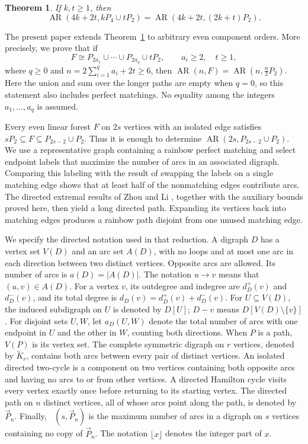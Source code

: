 \documentclass[10pt,a4paper]{article}
\newtheorem{theorem}{Theorem}[section]
\DeclareMathOperator{\AR}{AR}
\DeclareMathOperator{\exdir}{ex_{dir}}
\newcommand{\dP}{\overrightarrow{P}}
\newcommand{\sK}{\overleftrightarrow{K}}
\begin{document}
\begin{theorem}{\rm\cite{GJJLP}}\label{lem:published-p4}
If $k,t\ge1$, then
\[
 \AR(4k+2t,kP_4\cup tP_2)=\AR(4k+2t,(2k+t)P_2).
\]
\end{theorem}

The present paper extends Theorem~\ref{lem:published-p4} to arbitrary even
component orders. More precisely, we prove that if
\[
 F\cong P_{2a_1}\cup\cdots\cup P_{2a_q}\cup tP_2,
 \qquad a_i\ge2,\quad t\ge1,
\]
where $q\ge0$ and $n=2\sum_{i=1}^{q}a_i+2t\ge6$, then
$\AR(n,F)=\AR(n,\frac{n}{2}P_2)$. Here the union and sum over the longer
paths are empty when $q=0$, so this statement also includes perfect
matchings. No equality among the integers $a_1,\ldots,a_q$ is assumed.

Every even linear forest $F$ on $2s$ vertices with an isolated edge satisfies
$sP_2\subseteq F\subseteq P_{2s-2}\cup P_2$. Thus it is enough to determine
$\AR(2s,P_{2s-2}\cup P_2)$. We use a representative graph containing a
rainbow perfect matching and select endpoint labels that maximize the
number of arcs in an associated digraph. Comparing this labeling with
the result of swapping the labels on a single matching edge shows that
at least half of the nonmatching edges contribute arcs. The directed
extremal results of Zhou and Li \cite{ZL}, together with the auxiliary
bounds proved here, then yield a long directed path. Expanding its
vertices back into matching edges produces a rainbow path disjoint
from one unused matching edge.

We specify the directed notation used in that reduction. A digraph $D$
has a vertex set $V(D)$ and an arc set $A(D)$, with no loops and at most
one arc in each direction between two distinct vertices. Opposite arcs
are allowed. Its number of arcs is $a(D)=|A(D)|$.
The notation $u\to v$ means that $(u,v)\in A(D)$.
For a vertex $v$, its outdegree and indegree are $d_D^+(v)$ and $d_D^-(v)$,
and its total degree is $d_D(v)=d_D^+(v)+d_D^-(v)$.
For $U\subseteq V(D)$, the induced subdigraph on $U$ is denoted by $D[U]$;
$D-v$ means $D[V(D)\setminus\{v\}]$.
For disjoint sets $U,W$, let $a_D(U,W)$ denote the total number of arcs
with one endpoint in $U$ and the other in $W$, counting both directions.
When $P$ is a path, $V(P)$ is its vertex set.
The complete symmetric digraph on $r$ vertices, denoted by $\sK_r$,
contains both arcs between every pair of distinct vertices.
An isolated directed two-cycle is a component on two vertices containing
both opposite arcs and having no arcs to or from other vertices.
A directed Hamilton cycle visits every vertex
exactly once before returning to its starting vertex.
The directed path on $n$ distinct vertices, all of whose arcs point along
the path, is denoted by $\dP_n$.
Finally, $\exdir(s,\dP_n)$ is the maximum number of arcs in a digraph on
$s$ vertices containing no copy of $\dP_n$.
The notation $\lfloor x\rfloor$ denotes the integer part of $x$.
\end{document}
